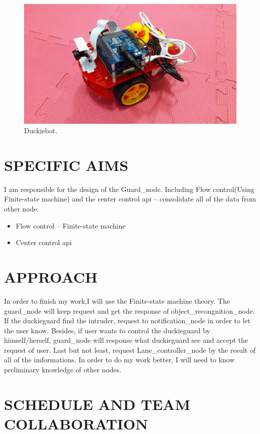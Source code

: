 \documentclass[letterpaper, 10 pt, conference]{ieeeconf}  %
\begin{document}
\begin{figure}[t] %
\includegraphics[width=0.8\columnwidth]{duckiebot}
\centering
\caption{Duckiebot.}
 \label{figure:duckiebot}
\end{figure}

\section{SPECIFIC AIMS}

I am responsible for the design of the Guard\_node. Including Flow control(Using Finite-state machine) and the center control api -- consolidate all of the data from other node.

\begin{itemize}
\item Flow control -- Finite-state machine
\item Center control api
\end{itemize}

\section{APPROACH}

In order to finish my work,I will use the Finite-state machine theory. The guard\_node will keep request and get the response of object\_recongnition\_node. If the duckieguard find the intruder, request to notification\_node in order to let the user know. Besides, if user wants to control the duckieguard by himself/herself, guard\_node will response what duckieguard see and accept the request of user. Last but not least, request Lane\_controller\_node by the result of all of the imformations.
In order to do my work better, I will need to know preliminary knowledge of other nodes.

\section{SCHEDULE AND TEAM COLLABORATION}
\end{document}
